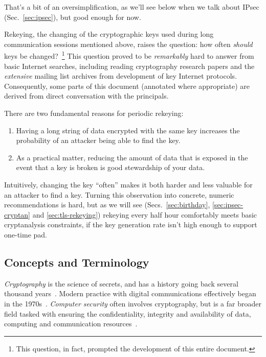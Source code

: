 That's a bit of an oversimplification, as we'll see below when we talk
about IPsec (Sec.~\ref{sec:ipsec}), but good enough for now.

Rekeying, the changing of the cryptographic keys used during long
communication sessions mentioned above, raises the question: how often
\emph{should} keys be changed?~\footnote{This question, in fact,
  prompted the development of this entire document.}  This question
proved to be \emph{remarkably} hard to answer from basic Internet
searches, including reading cryptography research papers and the
\emph{extensive} mailing list archives from development of key
Internet protocols.  Consequently, some parts of this document
(annotated where appropriate) are derived from direct conversation
with the principals.

There are two fundamental reasons for periodic rekeying:

\begin{enumerate}
\item Having a long string of data encrypted with the same key increases
the probability of an attacker being able to find the key.
\item As a practical matter, reducing the amount of data that is exposed
in the event that a key is broken is good stewardship of your data.
\end{enumerate}

Intuitively, changing the key ``often'' makes it both harder and less
valuable for an attacker to find a key.  Turning this observation into
concrete, numeric recommendations is hard, but as we will see
(Secs.~\ref{sec:birthday}, \ref{sec:ipsec-cryptan} and
\ref{sec:tls-rekeying}) rekeying every half hour comfortably meets
basic cryptanalysis constraints, if the key generation rate isn't high
enough to support one-time pad.

\subsection{Concepts and Terminology}

\emph{Cryptography} is the science of secrets, and has a history going
back several thousand years~\cite{kahn1996codebreakers,singh1999code}.
Modern practice with digital communications effectively began in the
1970s~\cite{schneier96:_applied_crypto,menezes1996handbook}.
\emph{Computer security} often involves cryptography, but is a far
broader field tasked with ensuring the confidentiality, integrity and
availability of data, computing and communication
resources~\cite{bishop2002art}.


